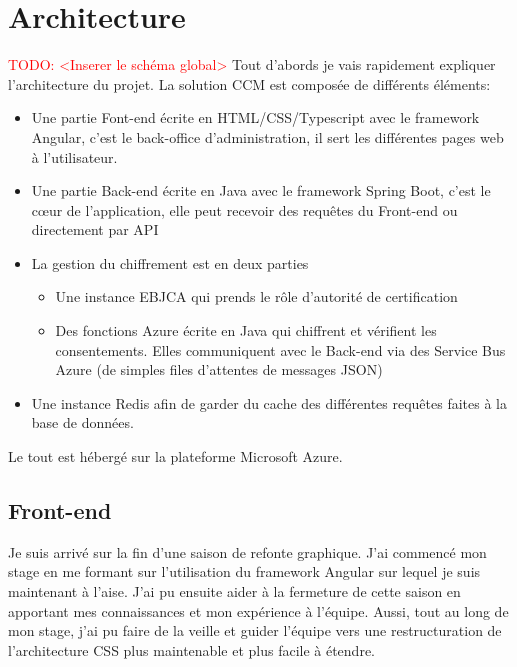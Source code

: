 \documentclass[12pt, a4paper]{report}
\makeatletter
\newcommand\tab[1][1cm]{\hspace*{#1}}
\newcommand\TODO[1]{\textcolor{red}{TODO\@: #1}}
\makeatother
\begin{document}
        \section{Architecture}
            \TODO{<Inserer le schéma global>} \newline
            Tout d'abords je vais rapidement expliquer l'architecture du projet.
            La solution CCM est composée de différents éléments:
            \begin{itemize}
                \item Une partie Font-end écrite en HTML/CSS/Typescript avec le framework Angular, c'est le back-office d'administration, il sert les différentes pages web à l'utilisateur.
                \item Une partie Back-end écrite en Java avec le framework Spring Boot, c'est le cœur de l'application, elle peut recevoir des requêtes du Front-end ou directement par API
                \item La gestion du chiffrement est en deux parties
                    \begin{itemize}
                        \item Une instance EBJCA qui prends le rôle d'autorité de certification
                        \item Des fonctions Azure écrite en Java qui chiffrent et vérifient les consentements. Elles communiquent avec le Back-end via des Service Bus Azure (de simples files d'attentes de messages JSON)
                    \end{itemize}
                \item Une instance Redis afin de garder du cache des différentes requêtes faites à la base de données.
            \end{itemize}
            Le tout est hébergé sur la plateforme Microsoft Azure.
            \subsection{Front-end}
                \tab{} Je suis arrivé sur la fin d'une saison de refonte graphique.
                J'ai commencé mon stage en me formant sur l'utilisation du framework Angular sur lequel je suis maintenant à l'aise.
                J'ai pu ensuite aider à la fermeture de cette saison en apportant mes connaissances et mon expérience à l'équipe.\newline
                Aussi, tout au long de mon stage, j'ai pu faire de la veille et guider l'équipe vers une restructuration de l'architecture CSS plus maintenable et plus facile à étendre.
\end{document}
